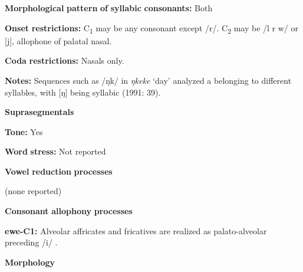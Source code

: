\documentclass[output=paper]{langsci/langscibook}
\begin{document}
\begin{styleBody}
\textbf{Morphological} \textbf{pattern} \textbf{of} \textbf{syllabic} \textbf{consonants:} Both
\end{styleBody}

\begin{styleBody}
\textbf{Onset} \textbf{restrictions:} C\textsubscript{1} may be any consonant except /r/. C\textsubscript{2} may be /l r w/ or [j], allophone of palatal nasal.
\end{styleBody}

\begin{styleBody}
\textbf{Coda} \textbf{restrictions:} Nasals only.
\end{styleBody}

\begin{styleBody}
\textbf{Notes:} Sequences such as /ŋk/ in \textit{ŋkeke} ‘day’ analyzed a belonging to different syllables, with [ŋ] being syllabic (1991: 39).
\end{styleBody}

\begin{styleBody}
\textbf{Suprasegmentals}
\end{styleBody}

\begin{styleBody}
\textbf{Tone:} Yes
\end{styleBody}

\begin{styleBody}
\textbf{Word} \textbf{stress:} Not reported
\end{styleBody}

\begin{styleBody}
\textbf{Vowel} \textbf{reduction} \textbf{processes}
\end{styleBody}

\begin{styleBody}
(none reported)
\end{styleBody}

\begin{styleBody}
\textbf{Consonant} \textbf{allophony} \textbf{processes}
\end{styleBody}

\begin{styleBody}
\textbf{ewe-C1:} Alveolar affricates and fricatives are realized as palato-alveolar preceding /i/ \citep[9]{Jalloh2005}.
\end{styleBody}

\begin{styleBody}
\textbf{Morphology}
\end{styleBody}
\end{document}
